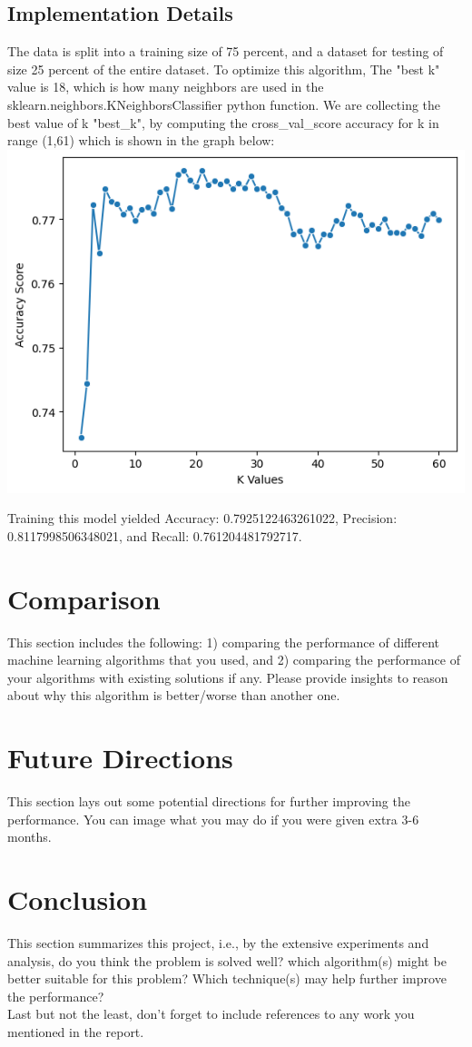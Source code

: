 \documentclass[conference]{IEEEtran}
\begin{document}
\subsection{Implementation Details}
The data is split into a training size of 75 percent, and a dataset for testing of size 25 percent of the entire dataset. To optimize this algorithm, The "best k" value is 18, which is how many neighbors are used in the sklearn.neighbors.KNeighborsClassifier python function. We are collecting the best value of k "best_k", by computing the cross_val_score accuracy for k in range (1,61) which is shown in the graph below:
\includegraphics{best-k-value.png}

Training this model yielded Accuracy: 0.7925122463261022, Precision: 0.8117998506348021, and Recall: 0.761204481792717.

\section{Comparison}  
This section includes the following: 1) comparing the performance of different machine learning algorithms that you used, and 2) comparing the performance of your algorithms with existing solutions if any. Please provide insights to reason about why this algorithm is better/worse than another one.

\section{Future Directions}
This section lays out some potential directions for further improving the performance. You can image what you may do if you were given extra 3-6 months.

\section{Conclusion}
This section summarizes this project, i.e., by the extensive experiments and analysis, do you think the problem is solved well? which algorithm(s) might be better suitable for this problem? Which technique(s) may help further improve the performance? \\

Last but not the least, don't forget to include references to any work you mentioned in the report.
  



\end{document}
